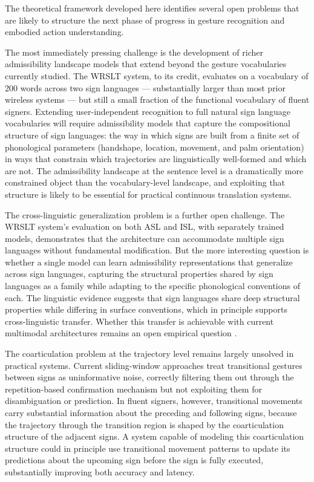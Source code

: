 \documentclass[11pt, a4paper]{article}
\theoremstyle{definition}
\begin{document}
The theoretical framework developed here identifies several open problems that are likely to structure the next phase of progress in gesture recognition and embodied action understanding.

The most immediately pressing challenge is the development of richer admissibility landscape models that extend beyond the gesture vocabularies currently studied. The WRSLT system, to its credit, evaluates on a vocabulary of 200 words across two sign languages --- substantially larger than most prior wireless systems --- but still a small fraction of the functional vocabulary of fluent signers. Extending user-independent recognition to full natural sign language vocabularies will require admissibility models that capture the compositional structure of sign languages: the way in which signs are built from a finite set of phonological parameters (handshape, location, movement, and palm orientation) in ways that constrain which trajectories are linguistically well-formed and which are not. The admissibility landscape at the sentence level is a dramatically more constrained object than the vocabulary-level landscape, and exploiting that structure is likely to be essential for practical continuous translation systems.

The cross-linguistic generalization problem is a further open challenge. The WRSLT system's evaluation on both ASL and ISL, with separately trained models, demonstrates that the architecture can accommodate multiple sign languages without fundamental modification. But the more interesting question is whether a single model can learn admissibility representations that generalize across sign languages, capturing the structural properties shared by sign languages as a family while adapting to the specific phonological conventions of each. The linguistic evidence suggests that sign languages share deep structural properties while differing in surface conventions, which in principle supports cross-linguistic transfer. Whether this transfer is achievable with current multimodal architectures remains an open empirical question \cite{kudrinko2021}.

The coarticulation problem at the trajectory level remains largely unsolved in practical systems. Current sliding-window approaches treat transitional gestures between signs as uninformative noise, correctly filtering them out through the repetition-based confirmation mechanism but not exploiting them for disambiguation or prediction. In fluent signers, however, transitional movements carry substantial information about the preceding and following signs, because the trajectory through the transition region is shaped by the coarticulation structure of the adjacent signs. A system capable of modeling this coarticulation structure could in principle use transitional movement patterns to update its predictions about the upcoming sign before the sign is fully executed, substantially improving both accuracy and latency.
\end{document}

